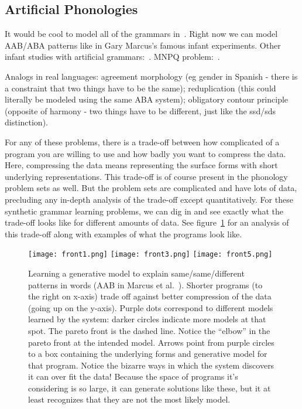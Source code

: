 \documentclass{article}
\begin{document}
\subsection{Artificial Phonologies}

It would be cool to model all of the grammars in~\cite{frank2011three}. Right now we can model AAB/ABA patterns like in Gary Marcus's famous infant experiments. Other infant studies with artificial grammars:~\cite{gerken2006decisions}. MNPQ problem:~\cite{smith1966grammatical}.

Analogs in real languages: agreement morphology (eg gender in Spanish
- there is a constraint that two things have to be the same);
reduplication (this could literally be modeled using the same ABA
system); obligatory contour principle (opposite of harmony - two
things have to be different, just like the ssd/sds distinction).

For any of these problems, there is a trade-off between how
complicated of a program you are willing to use and how badly you want
to compress the data. Here, compressing the data means representing
the surface forms with short underlying representations. This
trade-off is of course present in the phonology problem sets as well.
But the problem sets are complicated and have lots of data, precluding
any in-depth analysis of the trade-off except quantitatively. For
these synthetic grammar learning problems, we can dig in and see
exactly what the trade-off looks like for different amounts of data.
See figure~\ref{fronts} for an analysis of this trade-off along with
examples of what the programs look like.
\begin{figure}[h!]
  \texttt{[image: front1.png]}
  \texttt{[image: front3.png]}
  \texttt{[image: front5.png]}
  \caption{Learning a generative model to explain same/same/different patterns in words (AAB in Marcus et al.~\cite{marcus1999rule}). Shorter programs (to the right on x-axis) trade off against better compression of the data (going up on the y-axis). Purple dots correspond to different models learned by the system: darker circles indicate more models at that spot. The pareto front is the dashed line. Notice the ``elbow'' in the pareto front at the intended model. Arrows point from purple circles to a box containing the underlying forms and generative model for that program. Notice the bizarre ways in which the system discovers it can over fit the data! Because the space of programs it's considering is so large, it can generate solutions like these, but it at least recognizes that they are not the most likely model.}
  \label{fronts}
\end{figure}
\end{document}
